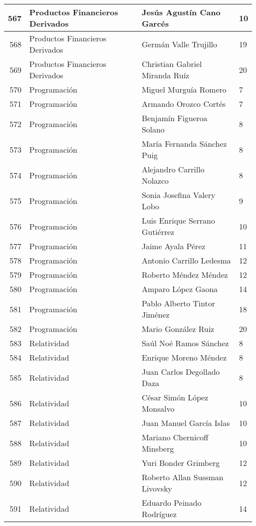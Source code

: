 \begin{table}[ht]
\begin{tabular}{rlll}
  567 & Productos Financieros Derivados & Jesús Agustín Cano Garcés & 10 \\ \hline
  568 & Productos Financieros Derivados & Germán Valle Trujillo & 19 \\ \hline
  569 & Productos Financieros Derivados & Christian Gabriel Miranda Ruíz & 20 \\ \hline
  570 & Programación & Miguel Murguía Romero & 7 \\ \hline
  571 & Programación & Armando Orozco Cortés & 7 \\ \hline
  572 & Programación & Benjamín Figueroa Solano & 8 \\ \hline
  573 & Programación & María Fernanda Sánchez Puig & 8 \\ \hline
  574 & Programación & Alejandro Carrillo Nolazco & 8 \\ \hline
  575 & Programación & Sonia Josefina Valery Lobo & 9 \\ \hline
  576 & Programación & Luis Enrique Serrano Gutiérrez & 10 \\ \hline
  577 & Programación & Jaime Ayala Pérez & 11 \\ \hline
  578 & Programación & Antonio Carrillo Ledesma & 12 \\ \hline
  579 & Programación & Roberto Méndez Méndez & 12 \\ \hline
  580 & Programación & Amparo López Gaona & 14 \\ \hline
  581 & Programación & Pablo Alberto Tintor Jiménez & 18 \\ \hline
  582 & Programación & Mario González Ruiz & 20 \\ \hline
  583 & Relatividad & Saúl Noé Ramos Sánchez & 8 \\ \hline
  584 & Relatividad & Enrique Moreno Méndez & 8 \\ \hline
  585 & Relatividad & Juan Carlos Degollado Daza & 8 \\ \hline
  586 & Relatividad & César Simón López Monsalvo & 10 \\ \hline
  587 & Relatividad & Juan Manuel García Islas & 10 \\ \hline
  588 & Relatividad & Mariano Chernicoff Minsberg & 10 \\ \hline
  589 & Relatividad & Yuri Bonder Grimberg & 12 \\ \hline
  590 & Relatividad & Roberto Allan Sussman Livovsky & 12 \\ \hline
  591 & Relatividad & Eduardo Peinado Rodríguez & 14 \\ \hline

\end{tabular}
\end{table}
